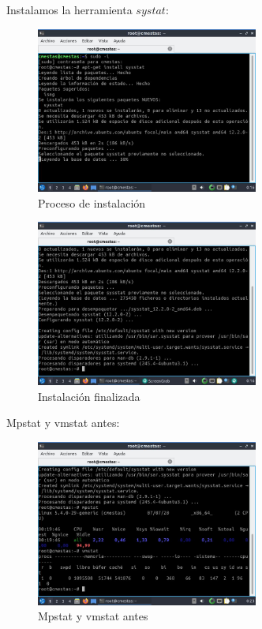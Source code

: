 \documentclass[12pt]{article}
\begin{document}
Instalamos la herramienta $systat$:

\begin{figure}[h]
    \centering
    \includegraphics[width=0.65\textwidth]{images/screenB01.jpg}
    \caption{Proceso de instalación}
\end{figure}

\begin{figure}[h]
    \centering
    \includegraphics[width=0.65\textwidth]{images/screenB02.jpg}
    \caption{Instalación finalizada}
\end{figure}

\clearpage
\newpage

Mpstat y vmstat antes:

\begin{figure}[h]
    \centering
    \includegraphics[width=0.65\textwidth]{images/screenB04.jpg}
    \caption{Mpstat y vmstat antes}
\end{figure}
\end{document}
